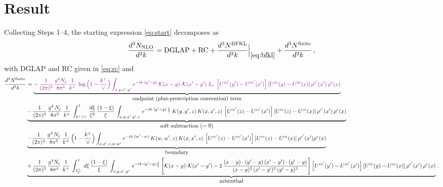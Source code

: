 \documentclass[10pt]{article}
\newcommand{\Leps}{L_{\epsilon}}
\newcommand{\KK}{\mathcal K(x-y)\!\cdot\!\mathcal K(x'-y')}
\newcommand{\Wbr}{\left[U^{ce'}(y') - U^{ce'}(x')\right] \left[U^{ce}(y) - U^{ce}(x)\right] \rho^{e'}(x')\, \rho^{e}(x)}
\begin{document}
\section{Result}
Collecting Steps 1--4, the starting expression \eqref{eq:start} decomposes as
\begin{align}
\frac{d^{3}N_{\rm NLO}}{d^{3}k}
={\rm DGLAP}+{\rm RC}+\frac{d^{3}N^{\rm BFKL}}{d^{3}k}\Big|_{\eqref{eq:bfkl}}
+\frac{d^{3}N^{\rm finite}}{d^{3}k}\,,
\end{align}
with DGLAP and RC given in \eqref{eq:rc} and
\begin{align}\label{eq:finite}
    \frac{d^{3}N^{\rm finite}}{d^{3}k}  & =
   \underbrace{{\color{violet}-\,\frac{1}{(2\pi)^{3}}\,\frac{g^{4}N_{c}}{8\pi^{4}}\,\frac{1}{k^{+}}\,\log\Big(1-\frac{k^{+}}{\vee}\Big)\int_{x,y,x',y'}e^{-ik\cdot(y'-y)}\,\KK\;\Leps\;\Wbr}}_{\textstyle \rm endpoint\ (plus\text{-}prescription\ convention)\ term}
    \notag \\ & \underbrace{-\,\frac{1}{(2\pi)^{3}}\,\frac{g^{4}\,N_{c}}{8\pi^{5}}\, \frac{1}{k^{+}}\,\int_{k^{+}/\vee}^{1}\,\frac{d\xi}{\xi^{2}}\,\frac{(1-\xi)}{\xi}\,\int_{x,y,x',y',z}\, e^{-ik\cdot (y'-y)\,\frac{1}{\xi}}\,K(y,y',z)\,K(x,x',z)\,
\left[U^{ce'}(z) - U^{ce'}(x')\right]\left[U^{ce}(z) - U^{ce}(x)\right]\rho^{e'}(x')\,\rho^{e}(x)}_{\textstyle \rm soft\ subtraction\ (=S)} \notag \\ &
    \underbrace{-\frac{1}{(2\pi)^{3}}\,\frac{g^{4}\,N_{c}}{8\pi^{5}}\,\frac{1}{k^{+}}\,\Big(1-\frac{k^{+}}{\vee}\Big)\int_{x,x',z,w,w'}e^{-ik\cdot (w'-w)}\,K(w,w',z)\,K(x,x',z)\,
\left[U^{ce'}(z) - U^{ce'}(x')\right]\left[U^{ce}(z) - U^{ce}(x)\right]\rho^{e'}(x')\rho^{e}(x)}_{\textstyle \rm boundary} \notag \\
&  \underbrace{+\,\frac{1}{(2\pi)^{3}}\,\frac{g^{4}N_{c}}{8\pi^{4}}\, \frac{1}{k^{+}}\,\int_{\frac{k^{+}}{\vee}}^{1}\,d\xi\, \frac{(1-\xi)}{\xi}\, \int_{x,y,x',y'}\,e^{-ik\cdot (y'-y)\frac{1}{\xi}}\,\Bigg[\KK -2\,\frac{(x-y)\cdot (y'-y)\, (x'-y')\cdot (y'-y)}{(x-y)^{2}\,(x'-y')^{2}\,(y'-y)^{2}}\Bigg]\Wbr}_{\textstyle \rm azimuthal}\,.
\end{align}
\end{document}
